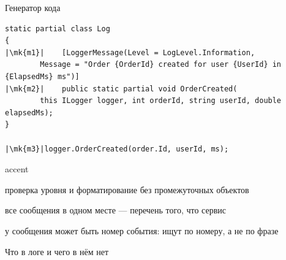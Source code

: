 \documentclass[aspectratio=169,10pt,t]{beamer}
\newcommand{\codesm}{\ttfamily\fontsize{7.6}{9.0}\selectfont}
\newcommand{\mk}[1]{\tikz[remember picture,overlay]\coordinate (#1) at (0,0.55ex);}
\begin{document}
\begin{frame}[fragile]{Генератор кода}
  \slidetop
\begin{lstlisting}[style=csharp,basicstyle=\codesm,escapechar=|]
static partial class Log
{
|\mk{m1}|    [LoggerMessage(Level = LogLevel.Information,
        Message = "Order {OrderId} created for user {UserId} in {ElapsedMs} ms")]
|\mk{m2}|    public static partial void OrderCreated(
        this ILogger logger, int orderId, string userId, double elapsedMs);
}

|\mk{m3}|logger.OrderCreated(order.Id, userId, ms);
\end{lstlisting}

  \slidegap
  \begin{cbul}{accent}
    \item проверка уровня и форматирование без промежуточных объектов
    \item все сообщения в одном месте --- перечень того, что сервис 
    \item у сообщения может быть номер события: ищут по номеру, а не по фразе
  \end{cbul}
\end{frame}

\begin{frame}{Что в логе и чего в нём нет}
  \slidetop

  \slidegap
\end{frame}
\end{document}
